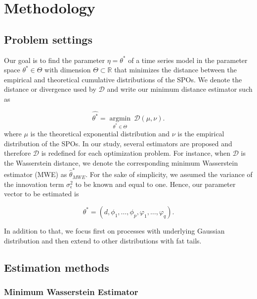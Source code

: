 \documentclass[
  11pt,
]{article}
\begin{document}
\hypertarget{methodology}{%
\section{Methodology}\label{methodology}}

\hypertarget{problem-settings}{%
\subsection{Problem settings}\label{problem-settings}}

Our goal is to find the parameter \(\eta = \theta^*\) of a time series
model in the parameter space \(\theta^* \in \Theta\) with dimension
\(\Theta \subset \mathbb{R}\) that minimizes the distance between the
empirical and theoretical cumulative distributions of the SPOs. We
denote the distance or divergence used by \(\mathcal{D}\) and write our
minimum distance estimator such as

\[\hat{\theta^*}=\underset{\theta^* \in \Theta}{\operatorname{argmin}} \ \mathcal{D}\left({\mu}, \nu\right) .\]
where \(\mu\) is the theoretical exponential distribution and \(\nu\) is
the empirical distribution of the SPOs. In our study, several estimators
are proposed and therefore \(\mathcal{D}\) is redefined for each
optimization problem. For instance, when \(\mathcal{D}\) is the
Wasserstein distance, we denote the corresponding minimum Wasserstein
estimator (MWE) as \(\hat \theta^*_{MWE}\). For the sake of simplicity,
we assumed the variance of the innovation term \(\sigma^2_\epsilon\) to
be known and equal to one. Hence, our parameter vector to be estimated
is

\[\theta^* = (d, \phi_{1}, \ldots, \phi_{p}, \varphi_{1}, \ldots, \varphi_{q}).\]

In addition to that, we focus first on processes with underlying
Gaussian distribution and then extend to other distributions with fat
tails.

\hypertarget{estimation-methods}{%
\subsection{Estimation methods}\label{estimation-methods}}

\hypertarget{minimum-wasserstein-estimator}{%
\subsubsection{Minimum Wasserstein
Estimator}\label{minimum-wasserstein-estimator}}
\end{document}
